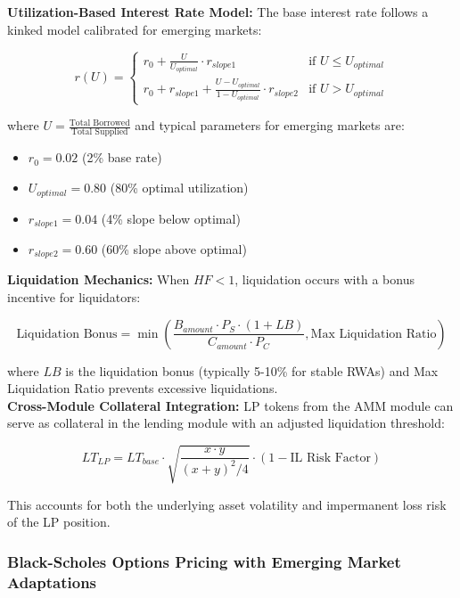 \documentclass[12pt]{article}
\begin{document}
\textbf{Utilization-Based Interest Rate Model:}
The base interest rate follows a kinked model calibrated for emerging markets:

\begin{equation}
r(U) = \begin{cases}
r_0 + \frac{U}{U_{optimal}} \cdot r_{slope1} & \text{if } U \leq U_{optimal} \\
r_0 + r_{slope1} + \frac{U - U_{optimal}}{1 - U_{optimal}} \cdot r_{slope2} & \text{if } U > U_{optimal}
\end{cases}
\end{equation}

where $U = \frac{\text{Total Borrowed}}{\text{Total Supplied}}$ and typical parameters for emerging markets are:
\begin{itemize}
\item $r_0 = 0.02$ (2\% base rate)
\item $U_{optimal} = 0.80$ (80\% optimal utilization)
\item $r_{slope1} = 0.04$ (4\% slope below optimal)
\item $r_{slope2} = 0.60$ (60\% slope above optimal)
\end{itemize}

\textbf{Liquidation Mechanics:}
When $HF < 1$, liquidation occurs with a bonus incentive for liquidators:

\begin{equation}
\text{Liquidation Bonus} = \min\left(\frac{B_{amount} \cdot P_S \cdot (1 + LB)}{C_{amount} \cdot P_C}, \text{Max Liquidation Ratio}\right)
\end{equation}

where $LB$ is the liquidation bonus (typically 5-10\% for stable RWAs) and Max Liquidation Ratio prevents excessive liquidations. \\

\textbf{Cross-Module Collateral Integration:}
LP tokens from the AMM module can serve as collateral in the lending module with an adjusted liquidation threshold:

\begin{equation}
LT_{LP} = LT_{base} \cdot \sqrt{\frac{x \cdot y}{(x + y)^2/4}} \cdot (1 - \text{IL Risk Factor})
\end{equation}

This accounts for both the underlying asset volatility and impermanent loss risk of the LP position.


\subsubsection{Black-Scholes Options Pricing with Emerging Market Adaptations}
\end{document}

